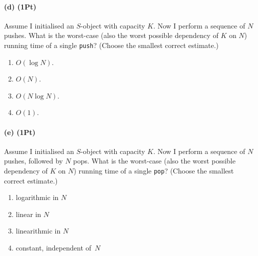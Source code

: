 \documentclass{tufte-handout}
\begin{document}
      \paragraph*{(d) (1Pt)}
      Assume I initialised an $S$-object with capacity $K$. 
      Now I perform a sequence of $N$ pushes.
      What is the worst-case (also the worst possible dependency of $K$ on $N$) running time of a single \texttt{push}?  (Choose the smallest correct estimate.)
      \begin{enumerate}
        \item $O(\log N)$. \\
        \item $O(N)$. \\
        \item $O(N\log N)$. \\
        \item  $O(1)$. \\
      \end{enumerate} 

      \paragraph*{(e) (1Pt)}
      Assume I initialised an $S$-object with capacity $K$. 
      Now I perform a sequence of $N$ pushes, followed by $N$ pops.
      What is the worst-case (also the worst possible dependency of $K$ on $N$) running time of a single \texttt{pop}?  (Choose the smallest correct estimate.)
      \begin{enumerate}
        \item logarithmic in $N$\\
        \item linear in $N$\\
        \item linearithmic in $N$\\
        \item constant, independent of~$N$
      \end{enumerate} 
\end{document}
